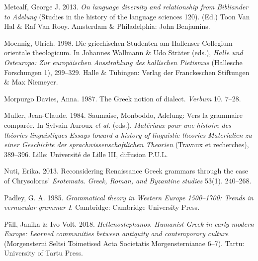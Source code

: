 \begin{styleStandard}
Metcalf, George J. 2013. \textit{On language diversity and relationship from Bibliander to Adelung} (Studies in the history of the language sciences 120). (Ed.) Toon Van Hal \& Raf Van Rooy. Amsterdam \& Philadelphia: John Benjamins.
\end{styleStandard}

\begin{styleStandard}
Moennig, Ulrich. 1998. Die griechischen Studenten am Hallenser Collegium orientale theologicum. In Johannes Wallmann \& Udo Sträter (eds.), \textit{Halle und Osteuropa: Zur europäischen Ausstrahlung des hallischen Pietismus} (Hallesche Forschungen 1), 299–329. Halle \& Tübingen: Verlag der Franckeschen Stiftungen \& Max Niemeyer.
\end{styleStandard}

\begin{styleStandard}
Morpurgo Davies, Anna. 1987. The Greek notion of dialect. \textit{Verbum} 10. 7–28.
\end{styleStandard}

\begin{styleStandard}
Muller, Jean-Claude. 1984. Saumaise, Monboddo, Adelung: Vers la grammaire comparée. In Sylvain Auroux \textit{et al.} (eds.), \textit{Matériaux pour une histoire des théories linguistiques }{\textbar}\textit{ Essays toward a history of linguistic theories }{\textbar}\textit{ Materialien zu einer Geschichte der sprachwissenschaftlichen Theorien} (Travaux et recherches), 389–396. Lille: Université de Lille III, diffusion P.U.L.
\end{styleStandard}

\begin{styleStandard}
Nuti, Erika. 2013. Reconsidering Renaissance Greek grammars through the case of Chrysoloras’ \textit{Erotemata}. \textit{Greek, Roman, and Byzantine studies} 53(1). 240–268.
\end{styleStandard}

\begin{styleStandard}
Padley, G. A. 1985. \textit{Grammatical theory in Western Europe 1500–1700: Trends in vernacular grammar I}. Cambridge: Cambridge University Press.
\end{styleStandard}

\begin{styleStandard}
Päll, Janika \& Ivo Volt. 2018. \textit{Hellenostephanos. Humanist Greek in early modern Europe: Learned communities between antiquity and contemporary culture} (Morgensterni Seltsi Toimetised {\textbar} Acta Societatis Morgensternianae 6–7). Tartu: University of Tartu Press.
\end{styleStandard}

